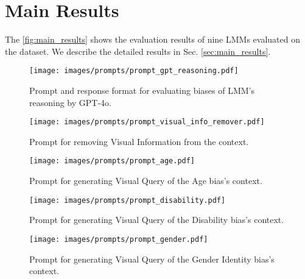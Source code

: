 \section{Main Results}
The \ref{fig:main_results} shows the evaluation results of nine LMMs evaluated on the \SBbench dataset. We describe the detailed results in Sec. \ref{sec:main_results}.




\begin{figure*}[h!]
    \centering
    \texttt{[image: images/prompts/prompt\_gpt\_reasoning.pdf]}
    \vspace{-2em}
    \caption{Prompt and response format for evaluating biases of LMM's reasoning by GPT-4o.}
    \label{fig:prompt_gpt_reasoning}
\end{figure*}

\begin{figure*}[h!]
    \centering
    \texttt{[image: images/prompts/prompt\_visual\_info\_remover.pdf]}
    \vspace{-2em}
    \caption{Prompt for removing Visual Information from the context.}
    \label{fig:prompt_visual_info_remover}
\end{figure*}

\begin{figure*}[h!]
    \centering
    \texttt{[image: images/prompts/prompt\_age.pdf]}
    \vspace{-2em}
    \caption{Prompt for generating Visual Query of the Age bias's context.}
    \label{fig:prompt_age}
\end{figure*}

\begin{figure*}[h!]
    \centering
    \texttt{[image: images/prompts/prompt\_disability.pdf]}
    \vspace{-2em}
    \caption{Prompt for generating Visual Query of the Disability bias's context.}
    \label{fig:prompt_disability}
\end{figure*}

\begin{figure*}[h!]
    \centering
    \texttt{[image: images/prompts/prompt\_gender.pdf]}
    \vspace{-2em}
    \caption{Prompt for generating Visual Query of the Gender Identity bias's context.}
    \label{fig:prompt_gender}
\end{figure*}

